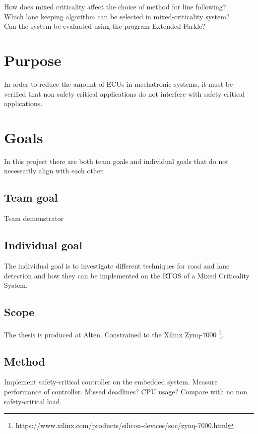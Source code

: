 How does mixed criticality affect the choice of method for line following?\\

Which lane keeping algorithm can be selected in mixed-criticality system?\\

Can the system be evaluated using the program Extended Farkle?

\section{Purpose}
In order to reduce the amount of ECUs in mechatronic systems, it must be verified that non safety critical applications do not interfere with safety critical applications.

\section{Goals}
In this project there are both team goals and individual goals that do not necessarily align with each other.

\subsection{Team goal}
Team demonstrator

\subsection{Individual goal}
The individual goal is to investigate different techniques for road and lane detection and how they can be implemented on the RTOS of a Mixed Criticality System.

\subsection{Scope}
The thesis is produced at Alten.
Constrained to the Xilinx Zynq-7000 \footnote{https://www.xilinx.com/products/silicon-devices/soc/zynq-7000.html}.

\subsection{Method}
Implement safety-critical controller on the embedded system. Measure performance of controller. Missed deadlines? CPU usage? Compare with no non safety-critical load.